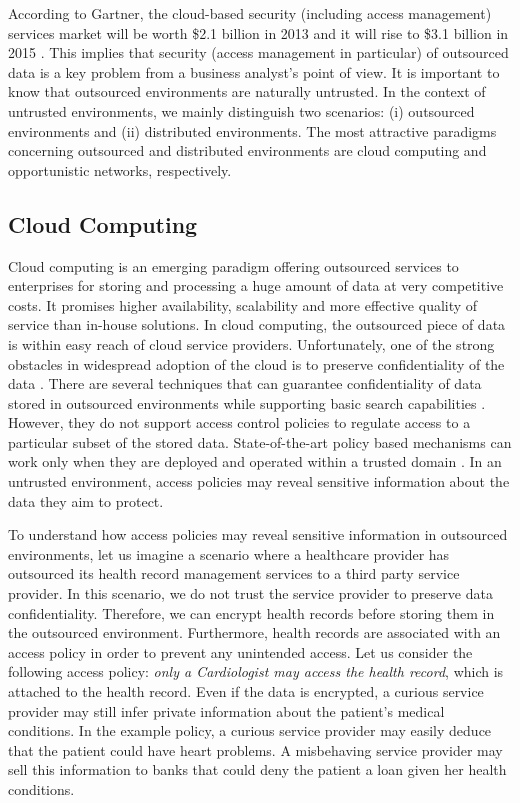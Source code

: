 \documentclass[epsfig,a4paper,11pt,titlepage]{book}
\numberwithin{algorithm}{chapter}
\begin{document}
According to Gartner, the cloud-based security (including access management) services market will be worth \$2.1 billion in 2013 and it will rise to \$3.1 billion in 2015 \cite{Gartner:2013}. This implies that security (access management in particular) of outsourced data is a key problem from a business analyst's point of view. It is important to know that outsourced environments are naturally untrusted. In the context of untrusted environments, we mainly distinguish two scenarios: (i) outsourced environments and (ii) distributed environments. The most attractive paradigms concerning outsourced and distributed environments are cloud computing and opportunistic networks, respectively.

\subsection{Cloud Computing}
Cloud computing is an emerging paradigm offering outsourced services to enterprises for storing and processing a huge amount of data at very competitive costs. It promises higher availability, scalability and more effective quality of service than in-house solutions. In cloud computing, the outsourced piece of data is within easy reach of cloud service providers. Unfortunately, one of the strong obstacles in widespread adoption of the cloud is to preserve confidentiality of the data \cite{Armbrust:2010}. There are several techniques that can guarantee confidentiality of data stored in outsourced environments while supporting basic search capabilities \cite{Hore:2012, Kamara:2012, Bosch:2011, Cao:2011, Li:2011, Yang:2011, Zhu:2011, Li:2010, Wang:2010, Yang:2009}. However, they do not support access control policies to regulate access to a particular subset of the stored data. State-of-the-art policy based mechanisms can work only when they are deployed and operated within a trusted domain \cite{Sandhu:1996}. In an untrusted environment, access policies may reveal sensitive information about the data they aim to protect.

To understand how access policies may reveal sensitive information in outsourced environments, let us imagine a scenario where a healthcare provider has outsourced its health record management services to a third party service provider. In this scenario, we do not trust the service provider to preserve data confidentiality. Therefore, we can encrypt health records before storing them in the outsourced environment. Furthermore, health records are associated with an access policy in order to prevent any unintended access. Let us consider the following access policy: \emph{only a Cardiologist may access the health record}, which is attached to the health record. Even if the data is encrypted, a curious service provider may still infer private information about the patient's medical conditions. In the example policy, a curious service provider may easily deduce that the patient could have heart problems. A misbehaving service provider may sell this information to banks that could deny the patient a loan given her health conditions.
\end{document}

